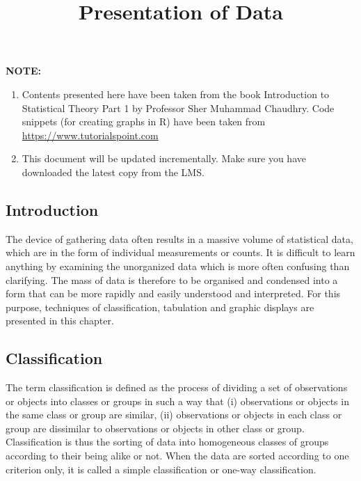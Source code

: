 \documentclass[]{article}
\title{Presentation of Data}
\author{}
\date{}
\providecommand{\tightlist}{%
  \setlength{\itemsep}{0pt}\setlength{\parskip}{0pt}}
\begin{document}
\maketitle

{
\setcounter{tocdepth}{2}
\tableofcontents
}
\textbf{NOTE:}

\begin{enumerate}
\def\labelenumi{\arabic{enumi}.}
\tightlist
\item
  Contents presented here have been taken from the book Introduction to
  Statistical Theory Part 1 by Professor Sher Muhammad Chaudhry. Code
  snippets (for creating graphs in R) have been taken from
  \url{https://www.tutorialspoint.com}
\item
  This document will be updated incrementally. Make sure you have
  downloaded the latest copy from the LMS.
\end{enumerate}

\hypertarget{introduction}{%
\subsection{Introduction}\label{introduction}}

The device of gathering data often results in a massive volume of
statistical data, which are in the form of individual measurements or
counts. It is difficult to learn anything by examining the unorganized
data which is more often confusing than clarifying. The mass of data is
therefore to be organised and condensed into a form that can be more
rapidly and easily understood and interpreted. For this purpose,
techniques of classification, tabulation and graphic displays are
presented in this chapter.

\hypertarget{classification}{%
\subsection{Classification}\label{classification}}

The term classification is defined as the process of dividing a set of
observations or objects into classes or groups in such a way that (i)
observations or objects in the same class or group are similar, (ii)
observations or objects in each class or group are dissimilar to
observations or objects in other class or group. Classification is thus
the sorting of data into homogeneous classes of groups according to
their being alike or not. When the data are sorted according to one
criterion only, it is called a simple classification or one-way
classification.
\end{document}
